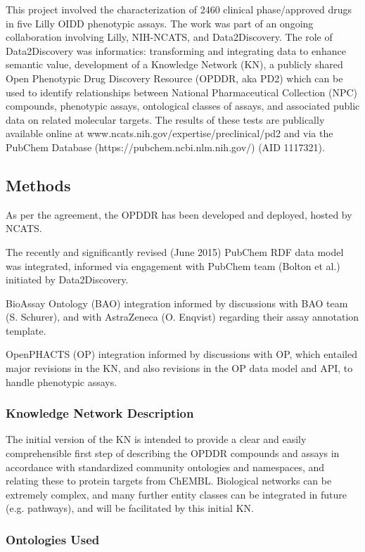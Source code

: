 This project involved the characterization of 2460 clinical phase/approved drugs in five Lilly OIDD phenotypic assays. The work was part of an ongoing collaboration involving Lilly, NIH-NCATS, and Data2Discovery.  The role of Data2Discovery was informatics: transforming and integrating data to enhance semantic value, development of a Knowledge Network (KN), a publicly shared Open Phenotypic Drug Discovery Resource (OPDDR, aka PD2) which can be used to identify relationships between National Pharmaceutical Collection (NPC) compounds, phenotypic assays, ontological classes of assays, and associated public data on related molecular targets. The results of these tests are publically available online at www.ncats.nih.gov/expertise/preclinical/pd2 and via the PubChem Database (https://pubchem.ncbi.nlm.nih.gov/) (AID 1117321).

\subsection{Methods}

As per the agreement, the OPDDR has been developed and deployed, hosted by NCATS. 

The recently and significantly revised (June 2015) PubChem RDF data model was integrated, informed via engagement with PubChem team (Bolton et al.) initiated by Data2Discovery.

BioAssay Ontology (BAO) integration informed by discussions with BAO team (S. Schurer), and with AstraZeneca (O. Enqvist) regarding their assay annotation template. 

OpenPHACTS (OP) integration informed by discussions with OP, which entailed major revisions in the KN, and also revisions in the OP data model and API, to handle phenotypic assays. 

\subsubsection{Knowledge Network Description}

The initial version of the KN is intended to provide a clear and easily comprehensible first step of describing the OPDDR compounds and assays in accordance with standardized community ontologies and namespaces, and relating these to protein targets from ChEMBL.  Biological networks can be extremely complex, and many further entity classes can be integrated in future (e.g. pathways), and will be facilitated by this initial KN.

\subsubsection{Ontologies Used}

